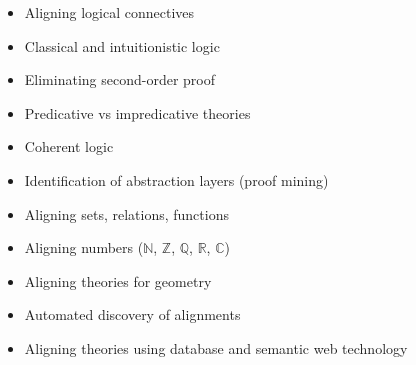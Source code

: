 \begin{workpackage}[id=alignment,wphases=0-48,type=RTD,
  short=Concept Alignment,%
  title=Concept Alignment,
  lead=Lee,
  LeeRM=72,
  LmuRM=36,
  StrRM=28,
  BelRM=18,
  ImtRM=22,
  InnRM=6,
  SacRM=15,
  FauRM=18,
  BolRM=14,
  InrRM=7
  ]

\begin{wpobjectives}
\end{wpobjectives}

\begin{wpdescription}
\end{wpdescription}

\begin{tasklist}
  \begin{task}[id=alignlogic,title=Alignment of logical foundations,lead=Lee]
    \begin{itemize}
    \item Aligning logical connectives
    \item Classical and intuitionistic logic
    \item Eliminating second-order proof
    \item Predicative vs impredicative theories
    \item Coherent logic
    \item Identification of abstraction layers (proof mining)
    \end{itemize}
  \end{task}
  
  \begin{task}[id=aligncasestudies,title=Case studies,lead=Str]
    \begin{itemize}
    \item Aligning sets, relations, functions
    \item Aligning numbers ($\mathbb{N}$, $\mathbb{Z}$, $\mathbb{Q}$,
      $\mathbb{R}$, $\mathbb{C}$)
    \item Aligning theories for geometry
    \end{itemize}
  \end{task}

  \begin{task}[id=aligntheories,title=Automated theory alignment,lead=Inr]
    \begin{itemize}
    \item Automated discovery of alignments
    \item Aligning theories using database and semantic web technology
    \end{itemize}
  \end{task}


\end{tasklist}
\end{workpackage}
